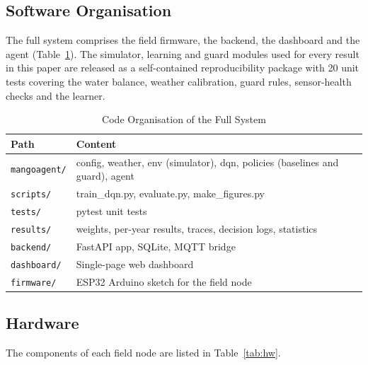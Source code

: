 \documentclass[conference]{IEEEtran}
\begin{document}
\subsection{Software Organisation}
The full system comprises the field firmware, the backend, the dashboard and the agent (Table~\ref{tab:repo}). The simulator, learning and guard modules used for every result in this paper are released as a self-contained reproducibility package with 20 unit tests covering the water balance, weather calibration, guard rules, sensor-health checks and the learner.

\begin{table}[!t]
\caption{Code Organisation of the Full System}
\label{tab:repo}
\centering
\footnotesize
\renewcommand{\arraystretch}{1.12}
\begin{tabular}{@{}>{\raggedright\arraybackslash}p{}>{\raggedright\arraybackslash}p{}@{}}
\toprule
\textbf{Path} & \textbf{Content} \\
\midrule
\texttt{mangoagent/} & config, weather, env (simulator), dqn, policies (baselines and guard), agent \\
\texttt{scripts/} & train\_dqn.py, evaluate.py, make\_figures.py \\
\texttt{tests/} & pytest unit tests \\
\texttt{results/} & weights, per-year results, traces, decision logs, statistics \\
\texttt{backend/} & FastAPI app, SQLite, MQTT bridge \\
\texttt{dashboard/} & Single-page web dashboard \\
\texttt{firmware/} & ESP32 Arduino sketch for the field node \\
\bottomrule
\end{tabular}
\end{table}

\subsection{Hardware}
The components of each field node are listed in Table~\ref{tab:hw}.
\end{document}
